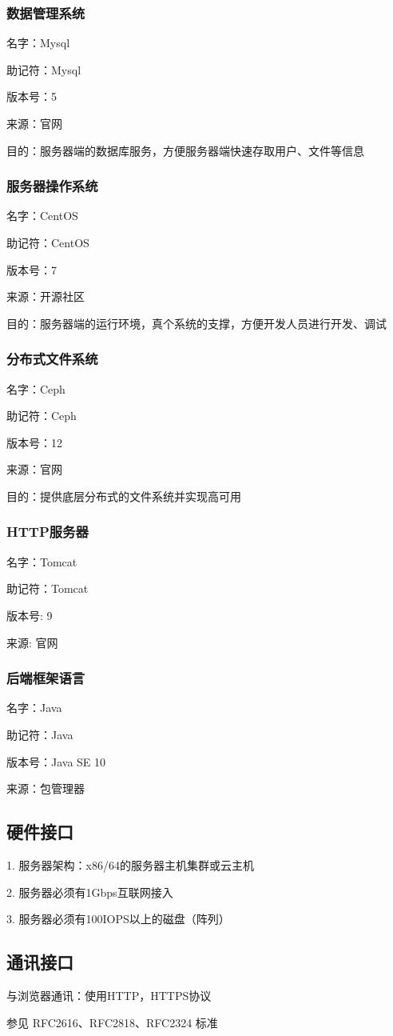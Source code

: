 \subsubsection{数据管理系统}

名字：Mysql

助记符：Mysql

版本号：5

来源：官网

目的：服务器端的数据库服务，方便服务器端快速存取用户、文件等信息

\subsubsection{服务器操作系统}

名字：CentOS 

助记符：CentOS

版本号：7

来源：开源社区

目的：服务器端的运行环境，真个系统的支撑，方便开发人员进行开发、调试

\subsubsection{分布式文件系统}

名字：Ceph

助记符：Ceph 

版本号：12

来源：官网

目的：提供底层分布式的文件系统并实现高可用

\subsubsection{HTTP服务器}

名字：Tomcat

助记符：Tomcat

版本号: 9

来源: 官网

\subsubsection{后端框架语言}

名字：Java

助记符：Java

版本号：Java SE 10

来源：包管理器 

\subsection{硬件接口}

1. 服务器架构：x86/64的服务器主机集群或云主机

2. 服务器必须有1Gbps互联网接入

3. 服务器必须有100IOPS以上的磁盘（阵列）

\subsection{通讯接口}

与浏览器通讯：使用HTTP，HTTPS协议

参见 RFC2616、RFC2818、RFC2324 标准


